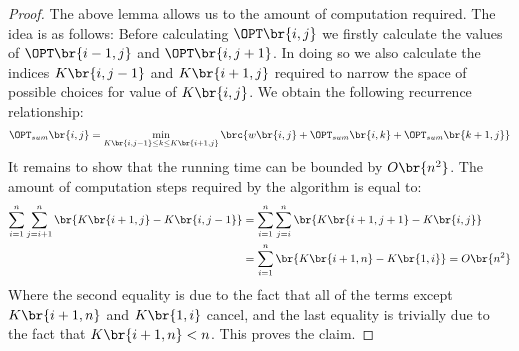 \begin{theorem}
\begin{proof}
The above lemma allows us to the amount of computation required. The idea is as follows: Before calculating $\OPT\br{i,j}$ we firstly calculate the values of $\OPT\br{i -1,j}$ and $\OPT\br{i,j + 1}$. In doing so we also calculate the indices $K\br{i,j-1}$ and $K\br{i +1,j}$ required to narrow the space of possible choices for value of $K\br{i,j}$. We obtain the following recurrence relationship:
$$
\OPT_{sum}\br{i,j} = \min_{K\br{i,j-1}\leq k\leq K\br{i +1,j}}\brc{w\br{i,j}+\OPT_{sum}\br{i, k}+ \OPT_{sum}\br{k+1, j}}
$$
It remains to show that the running time can be bounded by $O\br{n^2}$. The amount of computation steps required by the algorithm is equal to:
\begin{align*}
\sum_{i=1}^n\sum_{j=i+1}^n\br{K\br{i + 1, j} - K\br{i,j - 1}} &= \sum_{i=1}^n\sum_{j=i}^n\br{K\br{i + 1,j+1} - K\br{i,j}}
\\
&=\sum_{i=1}^n\br{K\br{i + 1,n}-K\br{1,i}} = O\br{n^2}
\end{align*}
Where the second equality is due to the fact that all of the terms except $K\br{i + 1,n}$ and $K\br{1,i}$ cancel, and the last equality is trivially due to the fact that $K\br{i + 1,n} < n$. This proves the claim.
    \end{proof}
\end{theorem}
